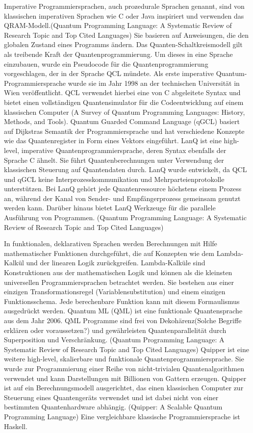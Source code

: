 Imperative Programmiersprachen, auch prozedurale Sprachen genannt, sind von klassischen imperativen Sprachen wie C oder Java inspiriert und verwenden das QRAM-Modell.(Quantum Programming Language: A Systematic Review of Research Topic and Top Cited Languages) Sie basieren auf Anweisungen, die den globalen Zustand eines Programms ändern. Das Quanten-Schaltkreismodell gilt als treibende Kraft der Quantenprogrammierung. Um dieses in eine Sprache einzubauen, wurde ein Pseudocode für die Quantenprogrammierung vorgeschlagen, der in der Sprache QCL mündete. Als erste imperative Quantum-Programmiersprache wurde sie im Jahr 1998 an der technischen Universität in Wien veröffentlicht. QCL verwendet hierbei eine von C abgeleitete Syntax und bietet einen vollständigen Quantensimulator für die Codeentwicklung auf einem klassischen Computer (A Survey of Quantum Programming Languages: History, Methods, and Tools). 
Quantum Guarded Command Language (qGCL) basiert auf Dijkstras Semantik der Programmiersprache und hat verschiedene Konzepte wie das Quantenregister in Form eines Vektors eingeführt. LanQ ist eine high-level, imperative Quantenprogrammiersprache, deren Syntax ebenfalls der Sprache C ähnelt. Sie führt Quantenberechnungen unter Verwendung der klassischen Steuerung auf Quantendaten durch. LanQ wurde entwickelt, da QCL und qGCL keine Interprozesskommunikation und Mehrparteienprotokolle unterstützen. Bei LanQ gehört jede Quantenressource höchstens einem Prozess an, während der Kanal von Sender- und Empfängerprozess gemeinsam genutzt werden kann. Darüber hinaus bietet LanQ Werkzeuge für die parallele Ausführung von Programmen. (Quantum Programming Language: A Systematic Review of Research Topic and Top Cited Languages)

In funktionalen, deklarativen Sprachen werden Berechnungen mit Hilfe mathematischer Funktionen durchgeführt, die auf Konzepten wie dem Lambda-Kalkül und der linearen Logik zurückgreifen. Lambda-Kalküle sind Konstruktionen aus der mathematischen Logik und können als die kleinsten universellen Programmiersprachen betrachtet werden. Sie bestehen aus einer einzigen Transformationsregel (Variablensubstitution) und einem einzigen Funktionsschema. Jede berechenbare Funktion kann mit diesem Formaulismus ausgedrückt werden.
Quantum ML (QML) ist eine funktionale Quantensprache aus dem Jahr 2006. QML Programme sind frei von Dekohärenz(Solche Begriffe erklären oder voraussetzen?) und gewährleisten Quantenparallelität durch Superposition und Verschränkung. (Quantum Programming Language: A Systematic Review of Research Topic and Top Cited Languages) Quipper ist eine weitere high-level, skalierbare und funktionale Quantenprogrammiersprache. Sie wurde zur Programmierung einer Reihe von nicht-trivialen Quantenalgorithmen verwendet und kann Darstellungen mit Billionen von Gattern erzeugen. Quipper ist auf ein Berechnungsmodell ausgerichtet, das einen klassischen Computer zur Steuerung eines Quantengeräts verwendet und ist dabei nicht von einer bestimmten Quantenhardware abhängig. (Quipper: A Scalable Quantum Programming Language) Eine vergleichbare klassische Programmiersprache ist Haskell.

